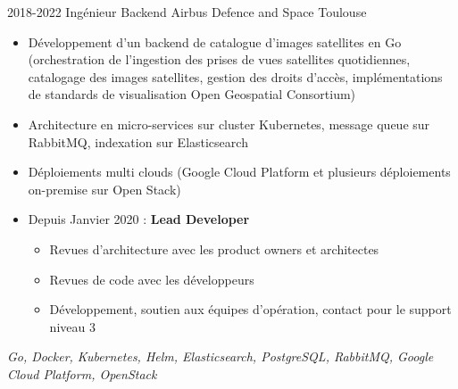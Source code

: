 \cventry
    {2018-2022}
    {Ingénieur Backend}
    {}
    {Airbus Defence and Space}
    {Toulouse}
    {
        \begin{itemize}
            \item Développement d'un backend de catalogue d'images satellites en Go (orchestration de l'ingestion des prises de vues satellites quotidiennes, catalogage des images satellites, gestion des droits d'accès, implémentations de standards de visualisation Open Geospatial Consortium)
            \item Architecture en micro-services sur cluster Kubernetes, message queue sur RabbitMQ, indexation sur Elasticsearch
            \item Déploiements multi clouds (Google Cloud Platform et plusieurs déploiements on-premise sur Open Stack)
            \item Depuis Janvier 2020 : \textbf{Lead Developer}
            \begin{itemize}
                \item Revues d'architecture avec les product owners et architectes
                \item Revues de code avec les développeurs
                \item Développement, soutien aux équipes d'opération, contact pour le support niveau 3
            \end{itemize}
        \end{itemize}
        \textit{Go, Docker, Kubernetes, Helm, Elasticsearch, PostgreSQL, RabbitMQ, Google Cloud Platform, OpenStack}
    }
\vspace*{0.2cm}
